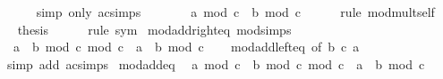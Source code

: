 \begin{isabellebody}
\ \ \ \ \isamarkupfalse%
\ {\isacharparenleft}{\kern0pt}simp\ only{\isacharcolon}{\kern0pt}\ ac{\isacharunderscore}{\kern0pt}simps{\isacharparenright}{\kern0pt}\isanewline
\ \ \isamarkupfalse%
\ \isamarkupfalse%
\ {\isachardoublequoteopen}{\isasymdots}\ {\isacharequal}{\kern0pt}\ {\isacharparenleft}{\kern0pt}a\ mod\ c\ {\isacharplus}{\kern0pt}\ b{\isacharparenright}{\kern0pt}\ mod\ c{\isachardoublequoteclose}\isanewline
\ \ \ \ \isamarkupfalse%
\ {\isacharparenleft}{\kern0pt}rule\ mod{\isacharunderscore}{\kern0pt}mult{\isacharunderscore}{\kern0pt}self{}{\isacharparenright}{\kern0pt}\isanewline
\ \ \isamarkupfalse%
\ \isamarkupfalse%
\ {\isacharquery}{\kern0pt}thesis\isanewline
\ \ \ \ \isamarkupfalse%
\ {\isacharparenleft}{\kern0pt}rule\ sym{\isacharparenright}{\kern0pt}\isanewline
{}\isamarkupfalse%
%
\endisatagproof
{\isafoldproof}%
%
\isadelimproof
\isanewline
%
\endisadelimproof
\isanewline
{}\isamarkupfalse%
\ mod{\isacharunderscore}{\kern0pt}add{\isacharunderscore}{\kern0pt}right{\isacharunderscore}{\kern0pt}eq\ {\isacharbrackleft}{\kern0pt}mod{\isacharunderscore}{\kern0pt}simps{\isacharbrackright}{\kern0pt}{\isacharcolon}{\kern0pt}\isanewline
\ \ {\isachardoublequoteopen}{\isacharparenleft}{\kern0pt}a\ {\isacharplus}{\kern0pt}\ b\ mod\ c{\isacharparenright}{\kern0pt}\ mod\ c\ {\isacharequal}{\kern0pt}\ {\isacharparenleft}{\kern0pt}a\ {\isacharplus}{\kern0pt}\ b{\isacharparenright}{\kern0pt}\ mod\ c{\isachardoublequoteclose}\isanewline
%
\isadelimproof
\ \ %
\endisadelimproof
%
\isatagproof
{}\isamarkupfalse%
\ mod{\isacharunderscore}{\kern0pt}add{\isacharunderscore}{\kern0pt}left{\isacharunderscore}{\kern0pt}eq\ {\isacharbrackleft}{\kern0pt}of\ b\ c\ a{\isacharbrackright}{\kern0pt}\ \isamarkupfalse%
\ {\isacharparenleft}{\kern0pt}simp\ add{\isacharcolon}{\kern0pt}\ ac{\isacharunderscore}{\kern0pt}simps{\isacharparenright}{\kern0pt}%
\endisatagproof
{\isafoldproof}%
%
\isadelimproof
\isanewline
%
\endisadelimproof
\isanewline
{}\isamarkupfalse%
\ mod{\isacharunderscore}{\kern0pt}add{\isacharunderscore}{\kern0pt}eq{\isacharcolon}{\kern0pt}\isanewline
\ \ {\isachardoublequoteopen}{\isacharparenleft}{\kern0pt}a\ mod\ c\ {\isacharplus}{\kern0pt}\ b\ mod\ c{\isacharparenright}{\kern0pt}\ mod\ c\ {\isacharequal}{\kern0pt}\ {\isacharparenleft}{\kern0pt}a\ {\isacharplus}{\kern0pt}\ b{\isacharparenright}{\kern0pt}\ mod\ c{\isachardoublequoteclose}\isanewline

\end{isabellebody}
